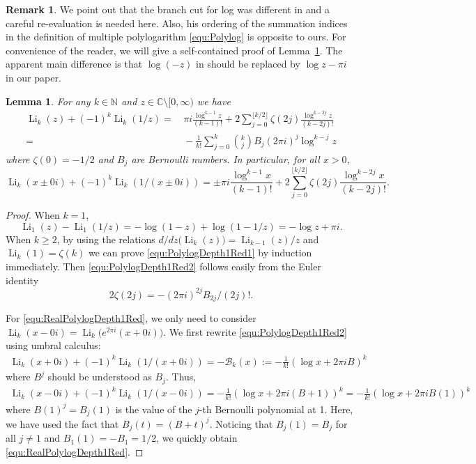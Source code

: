 \documentclass[11pt]{article}
\newcommand{\calB}{{\mathcal B}}
\DeclareMathOperator{\Li}{Li}
\def\N{\mathbb{N}}
\def\CC{\mathbb{C}}
\theoremstyle{plain}
\newtheorem{lem}[thm]{Lemma}
\theoremstyle{definition}
\newtheorem{re}[thm]{Remark}
\begin{document}
\begin{re}
We point out that the branch cut for log was different in \cite{Panzer2017} and a careful re-evaluation is needed here. Also, his ordering of the summation indices in the definition of multiple polylogarithm \eqref{equ:Polylog} is opposite to ours. For convenience of the reader, we will give a self-contained proof of Lemma~\ref{lem:PanzerDepth1Red}. The apparent main difference is that $\log(-z)$ in \cite{Panzer2017} should be replaced by $\log z-\pi i$ in our paper.
\end{re}

\begin{lem} \label{lem:PanzerDepth1Red}
For any $k\in\N$ and $z\in \CC\setminus[0,\infty)$ we have
\begin{align}\label{equ:PolylogDepth1Red1}
\Li_k(z)+(-1)^k\Li_k(1/z)
=&\, \pi i\frac{\log^{k-1} z}{(k-1)!} +2\sum_{j=0}^{\lfloor k/2 \rfloor} \zeta(2j)\frac{\log^{k-2j} z}{(k-2j)!} \\
=&\, -\frac1{k!}\sum_{j=0}^k \binom{k}{j}  B_j(2\pi i)^j \log^{k-j} z  \label{equ:PolylogDepth1Red2}
\end{align}
where $\zeta(0)=-1/2$ and $B_j$ are Bernoulli numbers. In particular, for all $x>0$,
\begin{equation}\label{equ:RealPolylogDepth1Red}
\Li_k(x\pm 0i)+(-1)^k\Li_k(1/(x\pm 0i))
= \pm \pi i\frac{\log^{k-1} x}{(k-1)!} +2\sum_{j=0}^{\lfloor k/2 \rfloor} \zeta(2j)\frac{\log^{k-2j} x}{(k-2j)!}.
\end{equation}
\end{lem}

\begin{proof}
When $k=1$,
\begin{equation*}
\Li_1(z)-\Li_1(1/z)=-\log(1-z)+\log(1-1/z)=-\log z+\pi i.
\end{equation*}
When $k\ge 2$, by using the relations $d/dz \big(\Li_k(z)\big)=\Li_{k-1}(z)/z$ and $\Li_k(1)=\zeta(k)$ we can prove \eqref{equ:PolylogDepth1Red1} by induction immediately. Then \eqref{equ:PolylogDepth1Red2} follows easily from the Euler identity
\begin{equation*}
2\zeta(2j)=-(2\pi i)^{2j} B_{2j}/(2j)!.
\end{equation*}

For \eqref{equ:RealPolylogDepth1Red}, we only need to consider $\Li_k(x-0i)=\Li_k\big(e^{2\pi i} (x+0i)\big)$.
We first rewrite \eqref{equ:PolylogDepth1Red2} using umbral calculus:
\begin{align}\label{equ:calB}
\Li_k(x+0i)+(-1)^k\Li_k(1/(x+0i))=-\calB_k(x):=-\frac1{k!}(\log x+2\pi i B)^k
\end{align}
where $B^j$ should be understood as $B_j$. Thus,
\begin{align*}
\Li_k(x-0i)+(-1)^k\Li_k(1/(x-0i))
=-\frac1{k!}(\log x+2\pi i (B+1))^k=-\frac1{k!}(\log x+2\pi i B(1))^k
\end{align*}
where $B(1)^j=B_j(1)$ is the value of the $j$-th Bernoulli polynomial at 1. Here, we have used the fact that
$B_j(t)=(B+t)^j$. Noticing that $B_j(1)=B_j$ for all $j\ne 1$ and $B_1(1)=-B_1=1/2$, we quickly obtain \eqref{equ:RealPolylogDepth1Red}.
\end{proof}
\end{document}
